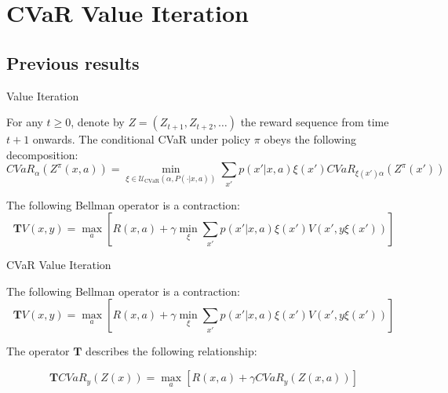 \documentclass{beamer}
\newcommand{\cvar}{\text{CVaR}}
\newcommand{\envelope}{\mathcal{U}_{\cvar}(\alpha, P(\cdot | x, a))}
\newcommand{\bround}[1]{\left( {#1} \right)}
\newcommand{\bsquare}[1]{\left[ {#1} \right]}
\begin{document}
\section{CVaR Value Iteration}
\subsection{Previous results}

\begin{frame}{Value Iteration}

\begin{theorem}
For any $t\geq 0$, denote by $Z  = (Z_{t+1},Z_{t+2},\dots)$ the reward sequence from time $t+1$ onwards. The conditional CVaR under policy $\pi$ obeys the following decomposition:
$$CVaR_\alpha\bround{Z^\pi(x, a)} = \min_{\xi \in \envelope} \sum_{x'} p(x'| x, a)\xi(x') CVaR_{\xi(x')\alpha}\bround{Z^\pi(x')}$$
\end{theorem}

\begin{theorem}
The following Bellman operator is a contraction:
$$\mathbf{T}V(x, y) = \max_a \bsquare{ R(x, a) + \gamma \min_{\xi} \sum_{x'} p(x'| x, a)\xi(x') V\bround{x', y\xi(x')}}$$
\end{theorem}

\end{frame}

\begin{frame}{CVaR Value Iteration}

\begin{theorem}
The following Bellman operator is a contraction:
$$\mathbf{T}V(x, y) = \max_a \bsquare{ R(x, a) + \gamma \min_{\xi} \sum_{x'} p(x'| x, a)\xi(x') V\bround{x', y\xi(x')}}$$
\end{theorem}

\vspace{1cm}

The operator $\mathbf{T}$ describes the following relationship:

$$\mathbf{T} CVaR_y(Z(x))=\max_a \bsquare{R(x, a) + \gamma CVaR_{y}(Z(x, a))}$$

\end{frame}
\end{document}
